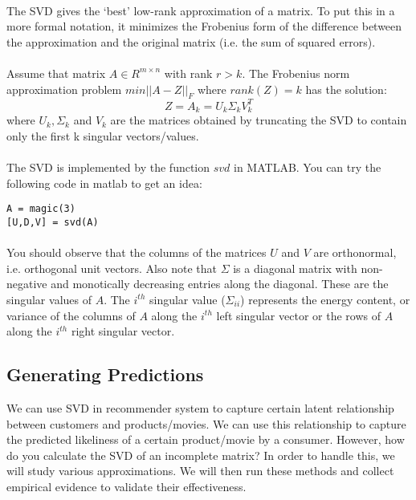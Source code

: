 \documentclass{article}
\begin{document}
\paragraph{}
The SVD gives the `best' low-rank approximation of a matrix. To put this in a more formal notation, it minimizes the Frobenius form of the difference between the approximation and the original matrix (i.e. the sum of squared errors).
\paragraph{}
Assume that matrix $A \in R^{m \times n}$ with rank $r > k$. The Frobenius norm approximation problem $min || A - Z ||_{F}$ where $rank(Z) = k$ has the solution:
\[Z = A_{k} = U_{k} \Sigma_{k} V_{k}^{T}\]
where $U_{k}, \Sigma_{k}$ and $V_{k}$ are the matrices obtained by truncating the SVD to contain only the first k singular vectors/values.
\paragraph{}
The SVD is implemented by the function $svd$ in MATLAB. You can try the following code in matlab to get an idea:
\begin{verbatim}
A = magic(3)
[U,D,V] = svd(A)
\end{verbatim}
\paragraph{}
You should observe that the columns of the matrices $U$ and $V$ are orthonormal, i.e. orthogonal unit vectors. Also note that $\Sigma$ is a diagonal matrix with non-negative and monotically decreasing entries along the diagonal. These are the singular values of $A$. The $i^{th}$ singular value ($\Sigma_{ii}$) represents the energy content, or variance of the columns of $A$ along the $i^{th}$ left singular vector or the rows of $A$ along the $i^{th}$ right singular vector.
  \subsection{Generating Predictions}
  We can use SVD in recommender system to capture certain latent relationship between customers and products/movies. We can use this relationship to capture the predicted likeliness of a certain product/movie by a consumer. However, how do you calculate the SVD of an incomplete matrix? In order to handle this, we will study various approximations. We will then run these methods and collect empirical evidence to validate their effectiveness.
\end{document}
